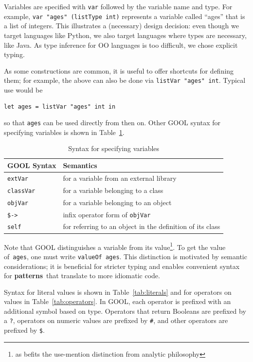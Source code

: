 \documentclass[sigplan,review,anonymous,prologue,dvipsnames]{acmart}
\newcommand{\abbrev}[1]{\textbf{#1}}
\newcommand{\oopatterns}{\abbrev{patterns}}
\begin{document}
Variables are specified with \verb|var| followed by the variable name and type.
For example, \verb|var "ages" (listType int)| represents a variable called
``ages'' that is a list of integers. This illustrates a (necessary) design
decision: even though we target languages like Python, we also target languages
where types are necessary, like Java. As type inference for OO languages is too
difficult, we chose explicit typing.

As some constructions are common, it is useful to offer shortcuts for
defining them; for example, the above can also be done via
\verb|listVar "ages" int|. Typical use would be
\begin{lstlisting}
let ages = listVar "ages" int in
\end{lstlisting}
so that \verb|ages| can be used directly from then on. Other GOOL syntax for
specifying variables is shown in Table~\ref{tab:variables}.

\begin{table}[!h]
\caption{Syntax for specifying variables}
\begin{tabular}{p{} p{}}
  \textbf{GOOL Syntax} & \textbf{Semantics} \\
  \midrule
  \verb|extVar| & for a variable from an external library \\
  \verb|classVar| & for a variable belonging to a class \\
  \verb|objVar| & for a variable belonging to an object \\
  \verb|$->| & infix operator form of \verb|objVar| \\
  \verb|self| & for referring to an object in the definition of its class \\
\end{tabular}
\label{tab:variables}
\end{table}

Note that GOOL distinguishes a variable from its value\footnote{
as befits the use-mention distinction from analytic philosophy}. To get
the value of~\verb|ages|, one must write \verb|valueOf ages|. This distinction 
is motivated by semantic considerations; it is beneficial for stricter typing 
and enables convenient syntax for \oopatterns~that translate to more idiomatic
code.

Syntax for literal values is shown in Table~\ref{tab:literals} and for
operators on values in Table~\ref{tab:operators}. In GOOL, each
operator is prefixed with an additional symbol based on type. Operators that
return Booleans are prefixed by a \verb|?|, operators on numeric values are
prefixed by \verb|#|, and other operators are prefixed by \verb|$|.
\end{document}
